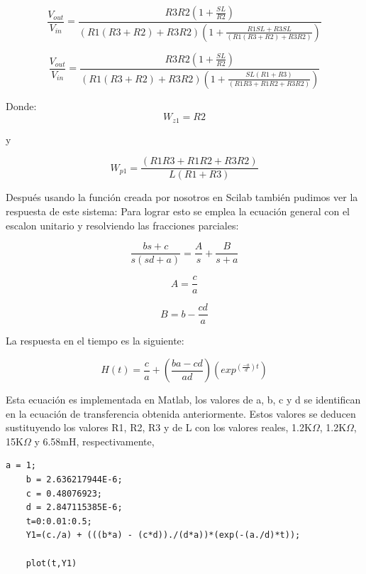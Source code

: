 \documentclass{report}
\newcounter{ns}
\begin{document}
	\begin{equation*}
	\frac{V_{out}}{V_{in}} = \frac{R3R2(1 + \frac{SL}{R2})}{(R1(R3 + R2) + R3R2)(1 + \frac{R1SL + R3SL}{(R1(R3 + R2) + R3R2)})}
	\end{equation*}
	
	\begin{equation*}
	\frac{V_{out}}{V_{in}} = \frac{R3R2(1 + \frac{SL}{R2})}{(R1(R3 + R2) + R3R2)(1 + \frac{SL(R1 + R3)}{(R1R3 + R1R2 + R3R2)})}
	\end{equation*}
	
	Donde:\\
	
	\begin{equation*}
	W_{z1} = R2
	\end{equation*}
	
	y
	
	\begin{equation*}
	W_{p1} = \frac{(R1R3 + R1R2 + R3R2)}{L(R1 + R3)}
	\end{equation*}
	
	Después usando la función creada por nosotros en Scilab también pudimos ver la respuesta de este sistema:  
	Para lograr esto se emplea la ecuación general con el escalon unitario y resolviendo las fracciones parciales:
	
	\begin{equation*}
	\frac{bs + c}{s(sd + a)} = \frac{A}{s} + \frac{B}{s + a}
	\end{equation*}
	
	\begin{equation*}
	A = \frac{c}{a}
	\end{equation*}
	
	\begin{equation*}
	B = b - \frac{cd}{a}
	\end{equation*}
	
	La respuesta en el tiempo es la siguiente:
	
	\begin{equation*}
	H(t) = \frac{c}{a} + (\frac{ba - cd}{ad})(exp^{(\frac{-a}{d})t})
	\end{equation*}
	
	Esta ecuación es implementada en Matlab, los valores de a, b, c y d se identifican en la ecuación de transferencia obtenida anteriormente. Estos valores se deducen sustituyendo los valores R1, R2, R3 y de L con los valores reales, 1.2K$\Omega$, 1.2K$\Omega$, 15K$\Omega$ y 6.58mH, respectivamente,
	
	\begin{lstlisting}[frame=single]
	a = 1;
	b = 2.636217944E-6;
	c = 0.48076923;
	d = 2.847115385E-6;
	t=0:0.01:0.5;
	Y1=(c./a) + (((b*a) - (c*d))./(d*a))*(exp(-(a./d)*t));
	
	plot(t,Y1)
	\end{lstlisting}
	
\end{document}
